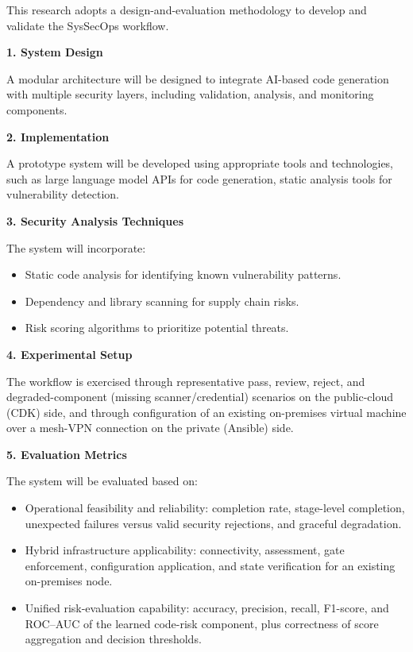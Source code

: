 This research adopts a design-and-evaluation methodology to develop and validate the SysSecOps
workflow.

\textbf{1. System Design}

A modular architecture will be designed to integrate AI-based code generation with multiple
security layers, including validation, analysis, and monitoring components.

\textbf{2. Implementation}

A prototype system will be developed using appropriate tools and technologies, such as large
language model APIs for code generation, static analysis tools for vulnerability detection.

\textbf{3. Security Analysis Techniques}

The system will incorporate:
\begin{itemize}
    \item Static code analysis for identifying known vulnerability patterns.
    \item Dependency and library scanning for supply chain risks.
    \item Risk scoring algorithms to prioritize potential threats.
\end{itemize}

\textbf{4. Experimental Setup}

The workflow is exercised through representative pass, review, reject, and degraded-component
(missing scanner/credential) scenarios on the public-cloud (CDK) side, and through configuration of
an existing on-premises virtual machine over a mesh-VPN connection on the private (Ansible) side.

\textbf{5. Evaluation Metrics}

The system will be evaluated based on:
\begin{itemize}
    \item Operational feasibility and reliability: completion rate, stage-level completion,
    unexpected failures versus valid security rejections, and graceful degradation.
    \item Hybrid infrastructure applicability: connectivity, assessment, gate enforcement,
    configuration application, and state verification for an existing on-premises node.
    \item Unified risk-evaluation capability: accuracy, precision, recall, F1-score, and ROC--AUC of
    the learned code-risk component, plus correctness of score aggregation and decision thresholds.
\end{itemize}

